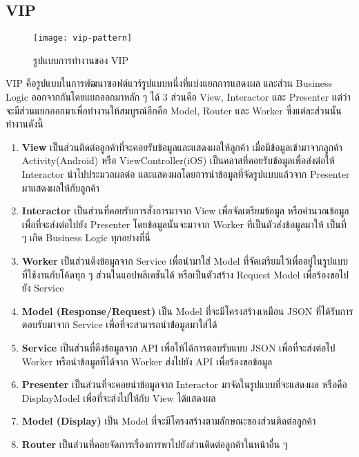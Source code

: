     \subsection{VIP}
        \begin{figure}[H]
            \centering
            \texttt{[image: vip-pattern]}
            \caption{รูปแบบการทำงานของ VIP}\label{vip-pattern}
        \end{figure}
        VIP คือรูปแบบในการพัฒนาซอฟต์แวร์รูปแบบหนึ่งที่แบ่งแยกการแสดงผล และส่วน Business Logic ออกจากกันโดยแยกออกมาหลัก ๆ ได้ 3 ส่วนคือ View, Interactor และ Presenter แต่ว่าจะมีส่วนแยกออกมาเพื่อทำงานให้สมบูรณ์อีกคือ Model, Router และ Worker
        ซึ่งแต่ละส่วนนั้นทำงานดังนี้
        \begin{enumerate}
            \item \textbf{View} เป็นส่วนติดต่อลูกค้าที่จะคอยรับข้อมูลและแสดงผลให้ลูกค้า เมื่อมีข้อมูลเข้ามาจากลูกค้า Activity(Android) หรือ ViewController(iOS) เป็นคลาสที่คอยรับข้อมูลเพื่อส่งต่อให้ Interactor นำไปประมวลผลต่อ และแสดงผลโดยการนำข้อมูลที่จัดรูปแบบแล้วจาก Presenter มาแสดงผลให้กับลูกค้า
            \item \textbf{Interactor} เป็นส่วนที่คอยรับการสั่งการมาจาก View เพื่อจัดเตรียมข้อมูล หรือคำนวณข้อมูลเพื่อที่จะส่งต่อไปยัง Presenter โดยข้อมูลนั้นจะมาจาก Worker ที่เป็นตัวส่งข้อมูลมาให้ เป็นที่ ๆ เกิด Business Logic ทุกอย่างที่นี่
            \item \textbf{Worker} เป็นส่วนดึงข้อมูลจาก Service เพื่อนำมาใส่ Model ที่จัดเตรียมไว้เพื่ออยู่ในรูปแบบที่ใช้งานกับโค้ดทุก ๆ ส่วนในแอปพลิเคชันได้ หรือเป็นตัวสร้าง Request Model เพื่อร้องขอไปยัง Service
            \item \textbf{Model (Response/Request)} เป็น Model ที่จะมีโครงสร้างเหมือน JSON ที่ได้รับการตอบรับมาจาก Service เพื่อที่จะสามารถนำข่้อมูลมาใส่ได้
            \item \textbf{Service} เป็นส่วนที่ดึงข้อมูลจาก API เพื่อให้ได้การตอบรับแบบ JSON เพื่อที่จะส่งต่อไป Worker หรือนำข้อมูลที่ได้จาก Worker ส่งไปยัง API เพื่อร้องขอข้อมูล
            \item \textbf{Presenter} เป็นส่วนที่จะคอยนำข้อมูลจาก Interactor มาจัดในรูปแบบที่จะแสดงผล หรือคือ DisplayModel เพื่อที่จะส่งไปให้กับ View ได้แสดงผล
            \item \textbf{Model (Display)} เป็น Model ที่จะมีโครงสร้างตามลักษณะของส่วนติดต่อลูกค้า
            \item \textbf{Router} เป็นส่วนที่คอยจัดการเรื่องการพาไปยังส่วนติดต่อลูกค้าในหน้าอื่น ๆ
        \end{enumerate}

